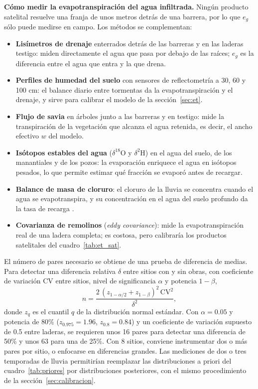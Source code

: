 \textbf{Cómo medir la evapotranspiración del agua infiltrada.} Ningún producto satelital resuelve una franja de unos metros detrás de una barrera, por lo que $e_g$ sólo puede medirse en campo. Los métodos se complementan:
\begin{itemize}
  \item \textbf{Lisímetros de drenaje} enterrados detrás de las barreras y en las laderas testigo: miden directamente el agua que pasa por debajo de las raíces; $e_g$ es la diferencia entre el agua que entra y la que drena.
  \item \textbf{Perfiles de humedad del suelo} con sensores de reflectometría a 30, 60 y 100 cm: el balance diario entre tormentas da la evapotranspiración y el drenaje, y sirve para calibrar el modelo de la sección~\ref{sec:et}.
  \item \textbf{Flujo de savia} en árboles junto a las barreras y en testigo: mide la transpiración de la vegetación que alcanza el agua retenida, es decir, el ancho efectivo $w$ del modelo.
  \item \textbf{Isótopos estables del agua} ($\delta^{18}$O y $\delta^2$H) en el agua del suelo, de los manantiales y de los pozos: la evaporación enriquece el agua en isótopos pesados, lo que permite estimar qué fracción se evaporó antes de recargar.
  \item \textbf{Balance de masa de cloruro}: el cloruro de la lluvia se concentra cuando el agua se evapotranspira, y su concentración en el agua del suelo profundo da la tasa de recarga .
  \item \textbf{Covarianza de remolinos} (\emph{eddy covariance}): mide la evapotranspiración real de una ladera completa; es costosa, pero calibraría los productos satelitales del cuadro~\ref{tab:et_sat}.
\end{itemize}

El número de pares necesario se obtiene de una prueba de diferencia de medias. Para detectar una diferencia relativa $\delta$ entre sitios con y sin obras, con coeficiente de variación $\text{CV}$ entre sitios, nivel de significancia $\alpha$ y potencia $1-\beta$,
\begin{equation}
n=\frac{2\,(z_{1-\alpha/2}+z_{1-\beta})^2\,\text{CV}^2}{\delta^2},
\end{equation}
donde $z_q$ es el cuantil $q$ de la distribución normal estándar. Con $\alpha=0.05$ y potencia de 80\% ($z_{0.975}=1.96$, $z_{0.8}=0.84$) y un coeficiente de variación supuesto de 0.5 entre laderas, se requieren unos 16 pares para detectar una diferencia de 50\% y unos 63 para una de 25\%. Con 8 sitios, conviene instrumentar dos o más pares por sitio, o enfocarse en diferencias grandes. Las mediciones de dos o tres temporadas de lluvia permitirían reemplazar las distribuciones a priori del cuadro~\ref{tab:priores} por distribuciones posteriores, con el mismo procedimiento de la sección~\ref{sec:calibracion}.


